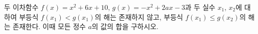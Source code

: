 두 이차함수 $f(x)=x^2+6x+10$, $g(x)=-x^2+2ax-3$과 두 실수 $x_1$, $x_2$에 대하여 부등식 $f(x_1)<g(x_1)$의 해는 존재하지 않고, 부등식 $f(x_1)\le g(x_2)$의 해는 존재한다. 이때 모든 정수 $a$의 값의 합을 구하시오.
